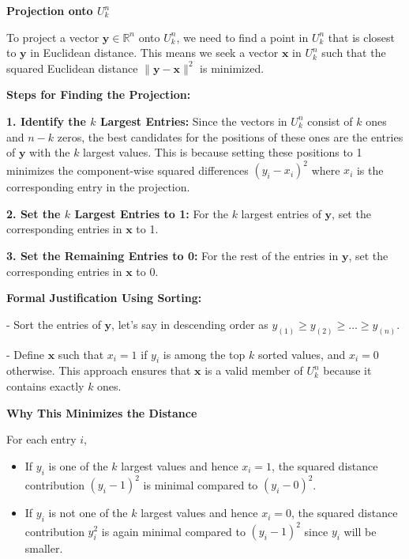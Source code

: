 \documentclass[8pt]{article}
\begin{document}
\textbf{Projection onto \( U_k^n \)}

To project a vector \(\mathbf{y} \in \mathbb{R}^n\) onto \( U_k^n \), we need to find a point in \( U_k^n \) that is closest to \(\mathbf{y}\) in Euclidean distance. This means we seek a vector \(\mathbf{x}\) in \( U_k^n \) such that the squared Euclidean distance \(\|\mathbf{y} - \mathbf{x}\|^2\) is minimized.

\textbf{Steps for Finding the Projection:}

\textbf{1. Identify the \(k\) Largest Entries:}
   Since the vectors in \( U_k^n \) consist of \(k\) ones and \(n-k\) zeros, the best candidates for the positions of these ones are the entries of \(\mathbf{y}\) with the \(k\) largest values. This is because setting these positions to 1 minimizes the component-wise squared differences \((y_i - x_i)^2\) where \(x_i\) is the corresponding entry in the projection.

\textbf{2. Set the \(k\) Largest Entries to 1:}
   For the \(k\) largest entries of \(\mathbf{y}\), set the corresponding entries in \(\mathbf{x}\) to 1.

\textbf{3. Set the Remaining Entries to 0:}
   For the rest of the entries in \(\mathbf{y}\), set the corresponding entries in \(\mathbf{x}\) to 0.

\textbf{Formal Justification Using Sorting:}

- Sort the entries of \(\mathbf{y}\), let's say in descending order as \( y_{(1)} \geq y_{(2)} \geq \ldots \geq y_{(n)} \).

- Define \(\mathbf{x}\) such that \( x_i = 1 \) if \( y_i \) is among the top \(k\) sorted values, and \( x_i = 0 \) otherwise. This approach ensures that \(\mathbf{x}\) is a valid member of \( U_k^n \) because it contains exactly \(k\) ones.

\textbf{Why This Minimizes the Distance}

For each entry \(i\),
\begin{itemize}
    \item If \(y_i\) is one of the \(k\) largest values and hence \(x_i = 1\), the squared distance contribution \( (y_i - 1)^2 \) is minimal compared to \( (y_i - 0)^2 \).
    \item If \(y_i\) is not one of the \(k\) largest values and hence \(x_i = 0\), the squared distance contribution \( y_i^2 \) is again minimal compared to \( (y_i - 1)^2 \) since \(y_i\) will be smaller.
\end{itemize}
\end{document}
